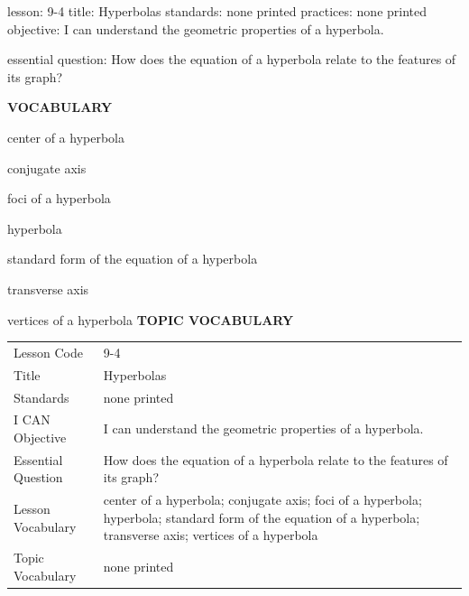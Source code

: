\documentclass{article}
\newenvironment{lesson-meta}{}{}        %
\newcommand{\te}[1]{}                   %
\begin{document}
\begin{lesson-meta}
lesson: 9-4
title: Hyperbolas
standards: none printed
practices: none printed
objective: I can understand the geometric properties of a hyperbola.

essential question: How does the equation of a hyperbola relate to the features of its graph?

\textbf{VOCABULARY}
\item center of a hyperbola
\item conjugate axis
\item foci of a hyperbola
\item hyperbola
\item standard form of the equation of a hyperbola
\item transverse axis
\item vertices of a hyperbola
\textbf{TOPIC VOCABULARY}
\te{No topic vocabulary list is printed on these pages.}
\begin{tabular}{ll}
Lesson Code & 9-4 \\
Title & Hyperbolas \\
Standards & none printed \\
I CAN Objective & I can understand the geometric properties of a hyperbola. \\
Essential Question & How does the equation of a hyperbola relate to the features of its graph? \\
Lesson Vocabulary & center of a hyperbola; conjugate axis; foci of a hyperbola; hyperbola; standard form of the equation of a hyperbola; transverse axis; vertices of a hyperbola \\
Topic Vocabulary & none printed \\
\end{tabular}
\end{lesson-meta}
\end{document}
